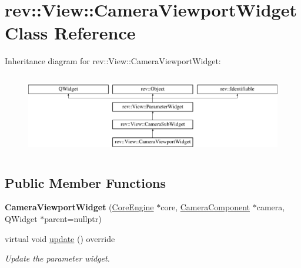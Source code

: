 \hypertarget{classrev_1_1_view_1_1_camera_viewport_widget}{}\section{rev\+::View\+::Camera\+Viewport\+Widget Class Reference}
\label{classrev_1_1_view_1_1_camera_viewport_widget}
Inheritance diagram for rev\+::View\+::Camera\+Viewport\+Widget\+:\begin{figure}[H]
\begin{center}
\leavevmode
\includegraphics[height=3.538705cm]{classrev_1_1_view_1_1_camera_viewport_widget}
\end{center}
\end{figure}
\subsection*{Public Member Functions}
\begin{DoxyCompactItemize}
\item 
\mbox{\label{classrev_1_1_view_1_1_camera_viewport_widget_a5fb2a0f7f772646de324539541b5c2e2}} 
{\bfseries Camera\+Viewport\+Widget} (\mbox{\hyperlink{classrev_1_1_core_engine}{Core\+Engine}} $\ast$core, \mbox{\hyperlink{classrev_1_1_camera_component}{Camera\+Component}} $\ast$camera, Q\+Widget $\ast$parent=nullptr)
\item 
\mbox{\label{classrev_1_1_view_1_1_camera_viewport_widget_ab2a540faf07f3c565462e008c5f0a3f7}} 
virtual void \mbox{\hyperlink{classrev_1_1_view_1_1_camera_viewport_widget_ab2a540faf07f3c565462e008c5f0a3f7}{update}} () override
\begin{DoxyCompactList}\small\item\em Update the parameter widget. \end{DoxyCompactList}\end{DoxyCompactItemize}

